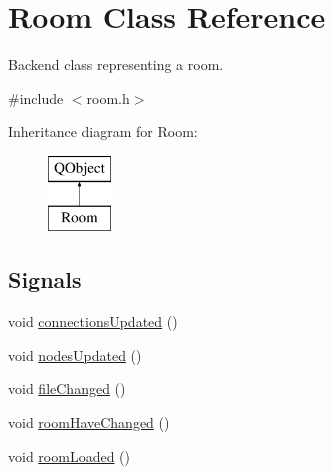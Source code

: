 \hypertarget{classRoom}{}\section{Room Class Reference}
\label{classRoom}


Backend class representing a room.  




{\ttfamily \#include $<$room.\+h$>$}

Inheritance diagram for Room\+:\begin{figure}[H]
\begin{center}
\leavevmode
\includegraphics[height=2.000000cm]{classRoom}
\end{center}
\end{figure}
\subsection*{Signals}
\begin{DoxyCompactItemize}
\item 
void \mbox{\hyperlink{classRoom_a4fad3e109783442157bb775ef417a57b}{connections\+Updated}} ()
\item 
void \mbox{\hyperlink{classRoom_a8261085c6843f3b85d403284b39f92ba}{nodes\+Updated}} ()
\item 
void \mbox{\hyperlink{classRoom_abc28a6555cb3e3543eecb65095ee89b7}{file\+Changed}} ()
\item 
void \mbox{\hyperlink{classRoom_ae37847fde9763f0561150f8bcfa0b550}{room\+Have\+Changed}} ()
\item 
void \mbox{\hyperlink{classRoom_abe1f81891e69cd6b511bbf18d7ce38c2}{room\+Loaded}} ()
\end{DoxyCompactItemize}

